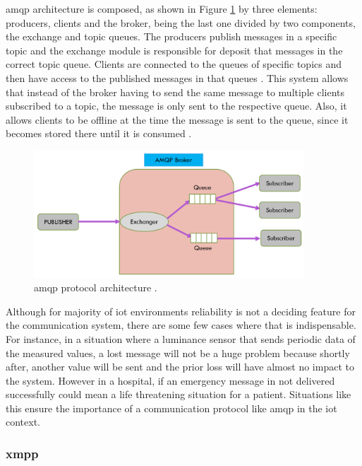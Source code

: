 \ac{amqp} architecture is composed, as shown in Figure \ref{fig:amqp} by three elements: producers, clients and the broker, being the last one divided by two components, the exchange and topic queues. The producers publish messages in a specific topic and the exchange module is responsible for deposit that messages in the correct topic queue. Clients are connected to the queues of specific topics and then have access to the published messages in that queues \cite{Salman2013}. This system allows that instead of the broker having to send the same message to multiple clients subscribed to a topic, the message is only sent to the respective queue. Also, it allows clients to be offline at the time the message is sent to the queue, since it becomes stored there until it is consumed \cite{Al-fuqaha2015}.

\begin{figure}[H]
	\centering
	\includegraphics[width=0.9\textwidth]{figures/amqp.png}
	\caption{\ac{amqp} protocol architecture \cite{Badugu}.}
	\label{fig:amqp}
\end{figure}

Although for majority of \ac{iot} environments reliability is not a deciding feature for the communication system, there are some few cases where that is indispensable. For instance, in a situation where a luminance sensor that sends periodic data of the measured values, a lost message will not be a huge problem because shortly after, another value will be sent and the prior loss will have almost no impact to the system. However in a hospital, if an emergency message in not delivered successfully could mean a life threatening situation for a patient. Situations like this ensure the importance of a communication protocol like \ac{amqp} in the \ac{iot} context.

\subsubsection{\acf{xmpp}}

